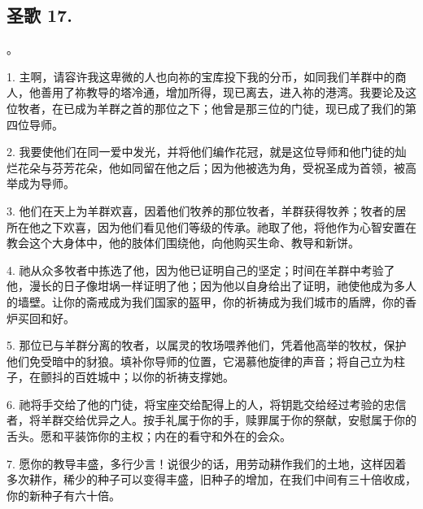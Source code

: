 \subsection{圣歌 17.}

。\par

1. 主啊，请容许我这卑微的人也向祢的宝库投下我的分币，如同我们羊群中的商人，他善用了祢教导的塔冷通，增加所得，现已离去，进入祢的港湾。我要论及这位牧者，在已成为羊群之首的那位之下；他曾是那三位的门徒，现已成了我们的第四位导师。\par

2. 我要使他们在同一爱中发光，并将他们编作花冠，就是这位导师和他门徒的灿烂花朵与芬芳花朵，他如同留在他之后；因为他被选为角，受祝圣成为首领，被高举成为导师。\par

3. 他们在天上为羊群欢喜，因着他们牧养的那位牧者，羊群获得牧养；牧者的居所在他之下欢喜，因为他们看见他们等级的传承。祂取了他，将他作为心智安置在教会这个大身体中，他的肢体们围绕他，向他购买生命、教导和新饼。\par

4. 祂从众多牧者中拣选了他，因为他已证明自己的坚定；时间在羊群中考验了他，漫长的日子像坩埚一样证明了他；因为他以自身给出了证明，祂使他成为多人的墙壁。让你的斋戒成为我们国家的盔甲，你的祈祷成为我们城市的盾牌，你的香炉买回和好。\par

5. 那位已与羊群分离的牧者，以属灵的牧场喂养他们，凭着他高举的牧杖，保护他们免受暗中的豺狼。填补你导师的位置，它渴慕他旋律的声音；将自己立为柱子，在颤抖的百姓城中；以你的祈祷支撑她。\par

6. 祂将手交给了他的门徒，将宝座交给配得上的人，将钥匙交给经过考验的忠信者，将羊群交给优异之人。按手礼属于你的手，赎罪属于你的祭献，安慰属于你的舌头。愿和平装饰你的主权；内在的看守和外在的会众。\par

7. 愿你的教导丰盛，多行少言！说很少的话，用劳动耕作我们的土地，这样因着多次耕作，稀少的种子可以变得丰盛，旧种子的增加，在我们中间有三十倍收成，你的新种子有六十倍。\par


